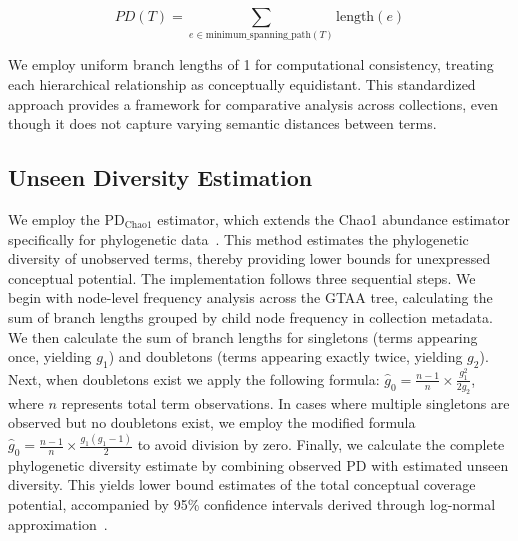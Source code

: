 \documentclass[final]{anthology-ch}
\begin{document}
$$PD(T) = \sum_{e \in \text{minimum\_spanning\_path}(T)} \text{length}(e)$$

We employ uniform branch lengths of 1 for computational consistency, treating each hierarchical relationship as conceptually equidistant. This standardized approach provides a framework for comparative analysis across collections, even though it does not capture varying semantic distances between terms. 

\subsection{Unseen Diversity Estimation}
We employ the $\textrm{PD}_{\textrm{Chao1}}$ estimator, which extends the Chao1 abundance estimator specifically for phylogenetic data~\cite{chaoDecipheringEnigmaUndetected2017, chiuImprovedNonparametricLower2014}. This method estimates the phylogenetic diversity of unobserved terms, thereby providing lower bounds for unexpressed conceptual potential.
%
The implementation follows three sequential steps. We begin with node-level frequency analysis across the GTAA tree, calculating the sum of branch lengths grouped by child node frequency in collection metadata. We then calculate the sum of branch lengths for singletons (terms appearing once, yielding $g_1$) and doubletons (terms appearing exactly twice, yielding $g_2$). Next, when doubletons exist we apply the following formula: $\hat{g}_0 = \frac{n-1}{n} \times \frac{g_1^2}{2g_2}$, where $n$ represents total term observations. In cases where multiple singletons are observed but no doubletons exist, we employ the modified formula $\hat{g}_0 = \frac{n-1}{n} \times \frac{g_1(g_1-1)}{2}$ to avoid division by zero. 
Finally, we calculate the complete phylogenetic diversity estimate by combining observed PD with estimated unseen diversity. This yields lower bound estimates of the total conceptual coverage potential, accompanied by 95\% confidence intervals derived through log-normal approximation~\cite{chaoDecipheringEnigmaUndetected2017,chaoEstimatingPopulationSize1987a}.
\end{document}
